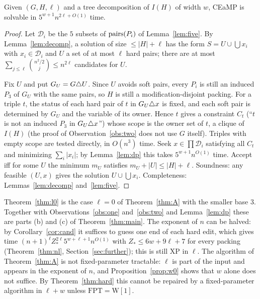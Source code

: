 \begin{theorem}\label{thm:A}
Given $(G,H,\ell)$ and a tree decomposition of $I(H)$ of width $w$, CEaMP is solvable in $5^{w+1}n^{2\ell+O(1)}$ time.
\end{theorem}
\begin{proof}
Let $\mathcal D_i$ be the $5$ subsets of $\mathrm{pairs}(P_i)$ of Lemma~\ref{lem:five}. By Lemma~\ref{lem:decomp}, a solution of size $\le|H|+\ell$ has the form $S=U\cup\bigcup x_i$ with $x_i\in\mathcal D_i$ and $U$ a set of at most $\ell$ hard pairs; there are at most $\sum_{j\le\ell}\binom{n^2/2}{j}\le n^{2\ell}$ candidates for $U$.

Fix $U$ and put $G_U=G\triangle U$. Since $U$ avoids soft pairs, every $P_i$ is still an induced $P_3$ of $G_U$ with the same pairs, so $H$ is still a modification-disjoint packing. For a triple $t$, the status of each hard pair of $t$ in $G_U\triangle x$ is fixed, and each soft pair is determined by $G_U$ and the variable of its owner. Hence $t$ gives a constraint $C_t$ (``$t$ is not an induced $P_3$ in $G_U\triangle x$'') whose scope is the owner set of $t$, a clique of $I(H)$ (the proof of Observation~\ref{obs:two} does not use $G$ itself). Triples with empty scope are tested directly, in $O(n^3)$ time. Seek $x\in\prod\mathcal D_i$ satisfying all $C_t$ and minimizing $\sum_i|x_i|$; by Lemma~\ref{lem:dp} this takes $5^{w+1}n^{O(1)}$ time. Accept iff for some $U$ the minimum $m_U$ satisfies $m_U+|U|\le|H|+\ell$. Soundness: any feasible $(U,x)$ gives the solution $U\cup\bigcup x_i$. Completeness: Lemmas~\ref{lem:decomp} and~\ref{lem:five}.
\end{proof}
Theorem~\ref{thm:l0} is the case $\ell=0$ of Theorem~\ref{thm:A} with the smaller base $3$. Together with Observations~\ref{obs:one} and~\ref{obs:two} and Lemma~\ref{lem:dp} these are parts (b) and (c) of Theorem~\ref{thm:main}. The exponent of $n$ can be halved: by Corollary~\ref{cor:cand} it suffices to guess one end of each hard edit, which gives time $(n+1)^{\ell}Z_*^{2\ell}5^{w+\ell+1}n^{O(1)}$ with $Z_*\le6w+9\ell+7$ for every packing (Theorem~\ref{thm:nl}, Section~\ref{sec:further}); this is still XP in $\ell$. The algorithm of Theorem~\ref{thm:A} is not fixed-parameter tractable: $\ell$ is part of the input and appears in the exponent of $n$, and Proposition~\ref{prop:w0} shows that $w$ alone does not suffice. By Theorem~\ref{thm:hard} this cannot be repaired by a fixed-parameter algorithm in $\ell+w$ unless $\mathrm{FPT}=\mathrm{W[1]}$.

